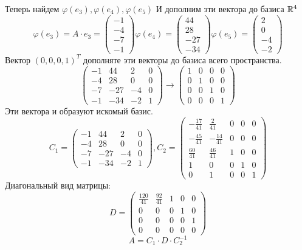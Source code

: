 Теперь найдем  $\varphi(e_3),\varphi(e_4),\varphi(e_5)$
И дополним эти вектора до базиса $\mathbb{R}^4$
$$\varphi(e_3) = A\cdot e_3 = \begin{pmatrix}
	-1 \\
	-4\\
	-7\\
	-1
\end{pmatrix}
\varphi(e_4) = \begin{pmatrix}
	44\\
	28 \\
	-27\\
	-34 
\end{pmatrix}
\varphi(e_5) = \begin{pmatrix}
2\\
0\\
-4 \\
-2 
\end{pmatrix}$$
Вектор $(0, 0, 0, 1)^T $ дополняте эти векторы до базиса всего пространства. \\
$$\begin{pmatrix}
-1 & 44 & 2 & 0  \\
-4 & 28 & 0 & 0 \\
-7 & -27 & -4 & 0\\
-1 & -34 & -2 & 1 
\end{pmatrix}\to \begin{pmatrix}
1 & 0 & 0 & 0 \\
0 & 1 & 0 & 0 \\
0 & 0 & 1 & 0 \\
0 & 0 & 0 & 1\end{pmatrix}$$
Эти вектора и образуют искомый базис.\\
$$C_1 = \begin{pmatrix}
	-1 & 44 & 2 & 0  \\
	-4 & 28 & 0 & 0 \\
	-7 & -27 & -4 & 0\\
	-1 & -34 & -2 & 1 
\end{pmatrix}, C_2 = \begin{pmatrix}
-\frac{17}{41} & \frac{2}{41} & 0 & 0 & 0 \\
-\frac{45}{41} & -\frac{14}{41} & 0 & 0 & 0\\
\frac{60}{41} & \frac{46}{41} & 1 & 0 & 0 \\
1 & 0 & 0 & 1 & 0 \\
0 & 1 & 0 & 0 & 1
\end{pmatrix}$$ 
Диагональный вид матрицы: $$D = \begin{pmatrix}
	\frac{120}{41} & \frac{92}{41} & 1 & 0 & 0 \\
	0 & 0 & 0 & 1 & 0 \\
	0 & 0 & 0 & 0 & 1 \\
	0 & 0 & 0 & 0 & 0
\end{pmatrix}$$
$$A = C_1\cdot D \cdot C_2^{-1}$$
